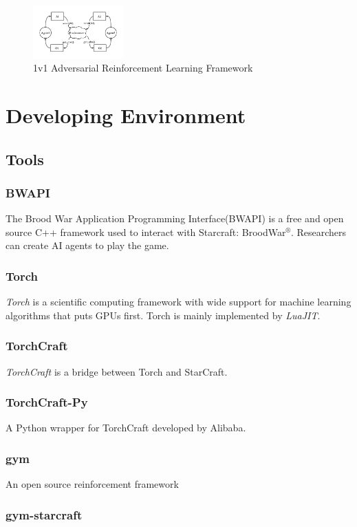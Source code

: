\documentclass[sigconf]{acmart}
\begin{document}
\begin{figure}[htb]
\centering
\caption{1v1 Adversarial Reinforcement Learning Framework}
\includegraphics[width=0.309\textwidth]{./img/Adversarial_Reinforcement_Learning.pdf}
\end{figure}

\section{Developing Environment}
\subsection{Tools}
\subsubsection{BWAPI}
The Brood War Application Programming Interface(BWAPI) is a free and open source C++ framework used to interact with Starcraft: BroodWar$^\circledR$. Researchers can create AI agents to play the game.\cite{GitHub:bwapi}
\subsubsection{Torch}
\emph{Torch} is a scientific computing framework with wide support for machine learning algorithms that puts GPUs first.
Torch is mainly implemented by \emph{LuaJIT}.\cite{GitHub:torch}
\subsubsection{TorchCraft}
\emph{TorchCraft} is a bridge between Torch and StarCraft.\cite{GitHub:TorchCraft}\cite{DBLP:journals/corr/SynnaeveNACLLRU16}
\subsubsection{TorchCraft-Py}
A Python wrapper for TorchCraft developed by Alibaba.\cite{GitHub:torchcraft-py}
\subsubsection{gym}
An open source reinforcement framework
\subsubsection{gym-starcraft}
\end{document}
